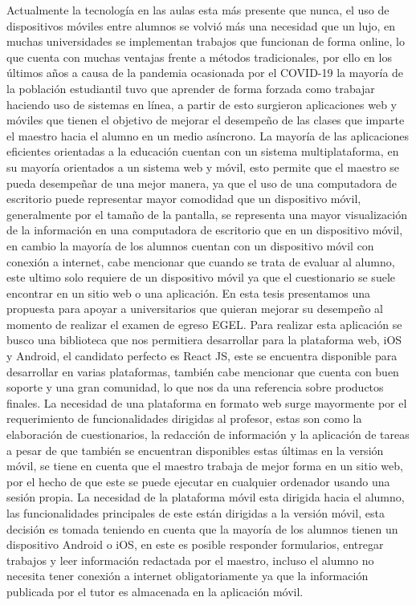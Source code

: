 \documentclass[12pt]{book}
\begin{document}
	{\normalsize Actualmente la tecnología en las aulas esta más presente que nunca, el uso de dispositivos móviles entre alumnos se volvió más una necesidad que un lujo, en muchas universidades se implementan trabajos que funcionan de forma online, lo que cuenta con muchas ventajas frente a métodos tradicionales, por ello en los últimos años a causa de la pandemia ocasionada por el COVID-19 la mayoría de la población estudiantil tuvo que aprender de forma forzada como trabajar haciendo uso de sistemas en línea, a partir de esto surgieron aplicaciones web y móviles que tienen el objetivo de mejorar el desempeño de las clases que imparte el maestro hacia el alumno en un medio asíncrono. La mayoría de las aplicaciones eficientes orientadas a la educación cuentan con un sistema multiplataforma, en su mayoría orientados a un sistema web y móvil, esto permite que el maestro se pueda desempeñar de una mejor manera, ya que el uso de una computadora de escritorio puede representar mayor comodidad que un dispositivo móvil, generalmente por el tamaño de la pantalla, se representa una mayor visualización de la información en una computadora de escritorio que en un dispositivo móvil, en cambio la mayoría de los alumnos cuentan con un dispositivo móvil con conexión a internet, cabe mencionar que cuando se trata de evaluar al alumno, este ultimo solo requiere de un dispositivo móvil ya que el cuestionario se suele encontrar en un sitio web o una aplicación. En esta tesis presentamos una propuesta para apoyar a universitarios que quieran mejorar su desempeño al momento de realizar el examen de egreso EGEL. Para realizar esta aplicación se busco una biblioteca que nos permitiera desarrollar para la plataforma web, iOS y Android, el candidato perfecto es React JS, este se encuentra disponible para desarrollar en varias plataformas, también cabe mencionar que cuenta con buen soporte y una gran comunidad, lo que nos da una referencia sobre productos finales. La necesidad de una plataforma en formato web surge mayormente por el requerimiento de funcionalidades dirigidas al profesor, estas son como la elaboración de cuestionarios, la redacción de información y la aplicación de tareas a pesar de que también se encuentran disponibles estas últimas en la versión móvil, se tiene en cuenta que el maestro trabaja de mejor forma en un sitio web, por el hecho de que este se puede ejecutar en cualquier ordenador usando una sesión propia. La necesidad de la plataforma móvil esta dirigida hacia el alumno, las funcionalidades principales de este están dirigidas a la versión móvil, esta decisión es tomada teniendo en cuenta que la mayoría de los alumnos tienen un dispositivo Android o iOS, en este es posible responder formularios, entregar trabajos y leer información redactada por el maestro, incluso el alumno no necesita tener conexión a internet obligatoriamente ya que la información publicada por el tutor es almacenada en la aplicación móvil.}
\end{document}
